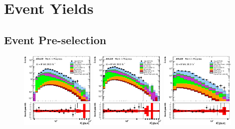 \section{Event Yields}
\label{sec:event_yield}


\subsection{Event Pre-selection}
\label{sec:preselection_yield}

\begin{figure}[ht!]
\centering
\includegraphics[width=0.32\textwidth]{figures/appendix_signal_selection/Nov24Update_FakeSys_KFacSys_LogY_NoRebin/output/jobs/MxM/DataFull_Rates_May13_FakeRatesExactly2Loose_MuonMxMBJetGt0_ElBJetGt0SubtractPC_MxM/PreselectionNov23_15_physics/weight_all/eps/LeadingLeptonPt_histratio.eps}
\includegraphics[width=0.32\textwidth]{figures/appendix_signal_selection/Nov24Update_FakeSys_KFacSys_LogY_NoRebin/output/jobs/MxM/DataFull_Rates_May13_FakeRatesExactly2Loose_MuonMxMBJetGt0_ElBJetGt0SubtractPC_MxM/PreselectionNov23_15_physics/weight_all/eps/SubleadingLeptonPt_histratio.eps}
\includegraphics[width=0.32\textwidth]{figures/appendix_signal_selection/Nov24Update_FakeSys_KFacSys_LogY_NoRebin/output/jobs/MxM/DataFull_Rates_May13_FakeRatesExactly2Loose_MuonMxMBJetGt0_ElBJetGt0SubtractPC_MxM/PreselectionNov23_15_physics/weight_all/eps/MinimumLeptonPt_histratio.eps}

\end{figure}
